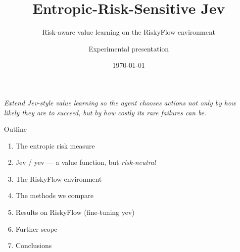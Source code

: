 \documentclass[aspectratio=169,11pt]{beamer}
\title[Entropic-Risk-Sensitive Jev]{Entropic-Risk-Sensitive Jev}
\subtitle{Risk-aware value learning on the RiskyFlow environment}
\author{Experimental presentation}
\date{\today}
\begin{document}
\begin{frame}[plain]
  \titlepage
  \begin{center}\small
  \textit{Extend Jev-style value learning so the agent chooses actions not only by how\\
  likely they are to succeed, but by how costly its rare failures can be.}
  \end{center}
\end{frame}

\begin{frame}{Outline}
  \begin{enumerate}
    \item The entropic risk measure
    \item Jev / yev --- a value function, but \emph{risk-neutral}
    \item The RiskyFlow environment
    \item The methods we compare
    \item Results on RiskyFlow (fine-tuning yev)
    \item Further scope
    \item Conclusions
  \end{enumerate}
\end{frame}

\end{document}
